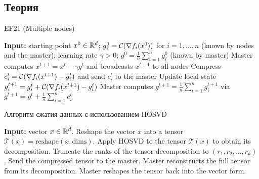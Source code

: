 \documentclass{article}
\begin{document}
\subsection{Теория}
\newcommand{\sqnorm}[1]{\left\lVert#1\right\rVert^2}
\newcommand{\algname}[1]{{\sf \footnotesize #1}\xspace}
\begin{algorithm}[H]
	\small
	\centering
	\caption{\algname{EF21} (Multiple nodes)}\label{alg:EF21}
	\begin{algorithmic}[1]
		\STATE \textbf{Input:} starting point $x^{0} \in \mathbb{R}^d$;  $g_i^0 = {\cal C}(\nabla f_i(x^0))$ for $i=1,\dots, n$ (known by nodes and the master); learning rate $\gamma>0$; $g^0 = \frac{1}{n}\sum_{i=1}^n g_i^0$ (known by master)
		\STATE Master computes $x^{t+1} = x^t - \gamma g^t$ and broadcasts $x^{t+1}$ to all nodes
		\STATE Compress $c_i^t = {\cal C}(\nabla f_i(x^{t+1}) - g_i^t)$ and send $c_i^t $ to the master
		\STATE Update local state $g_i^{t+1} = g_i^t + {\cal C}( \nabla f_i(x^{t+1}) - g_i^t)$
		\ENDFOR
		\STATE Master computes $g^{t+1} = \frac{1}{n} \sum_{i=1}^n  g_i^{t+1}$ via  $g^{t+1} = g^t + \frac{1}{n} \sum_{i=1}^n c_i^t $
		\ENDFOR
	\end{algorithmic}
	\end{algorithm}
\cite{richtarik2021ef21}
\newcommand{\T}{\mathcal{T}}
\begin{algorithm}[H]
        \small
        \centering
        \caption{Алгоритм сжатия данных с использованием HOSVD}
        \begin{algorithmic}[1]
            \STATE \textbf{Input:} vector $x \in \mathbb{R}^d$.
            \STATE Reshape the vector $x$ into a tensor $\T(x) = \text{reshape}(x, \text{dims})$.
            \STATE Apply HOSVD to the tensor $\T(x)$ to obtain its decomposition.
            \STATE Truncate the ranks of the tensor decomposition to $(r_1, r_2, \dots, r_k)$.
            \STATE Send the compressed tensor to the master.
            \STATE Master reconstructs the full tensor from its decomposition.
            \STATE Master reshapes the tensor back into the vector form.
        \end{algorithmic}        
    \end{algorithm}



\end{document}
